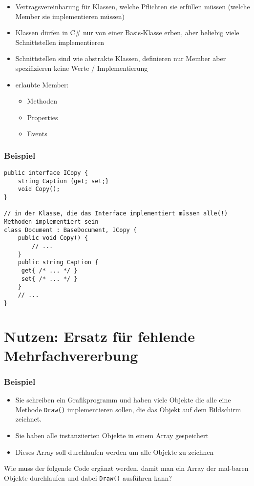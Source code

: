 \begin{itemize}
\item Vertragsvereinbarung für Klassen, welche Pflichten sie erfüllen müssen (welche Member sie implementieren müssen)
\item Klassen dürfen in C\# nur von einer Basis-Klasse erben, aber beliebig viele Schnittstellen implementieren
\item Schnittstellen sind wie abstrakte Klassen, definieren nur Member aber spezifizieren keine Werte / Implementierung
\item erlaubte Member: 
\begin{itemize}
\item Methoden
\item Properties
\item Events
\end{itemize}
\end{itemize}

\subsubsection*{Beispiel}

\begin{lstlisting}[language={[Sharp]C}]
public interface ICopy {
	string Caption {get; set;}
	void Copy();
}

// in der Klasse, die das Interface implementiert müssen alle(!) Methoden implementiert sein
class Document : BaseDocument, ICopy {
	public void Copy() {
		// ...
	}
	public string Caption {
	 get{ /* ... */ }
	 set{ /* ... */ }
	}
	// ...
}
\end{lstlisting}

\section{Nutzen: Ersatz für fehlende Mehrfachvererbung}

\subsubsection*{Beispiel}

\begin{itemize}
\item Sie schreiben ein Grafikprogramm und haben viele Objekte die alle eine Methode \lstinline$Draw()$ implementieren sollen, die das Objekt auf dem Bildschirm zeichnet. 
\item Sie haben alle instanziierten Objekte in einem Array gespeichert
\item Dieses Array soll durchlaufen werden um alle Objekte zu zeichnen
\end{itemize}
Wie muss der folgende Code ergänzt werden, damit man ein Array der mal-baren Objekte durchlaufen und dabei \lstinline$Draw()$ ausführen kann? 

